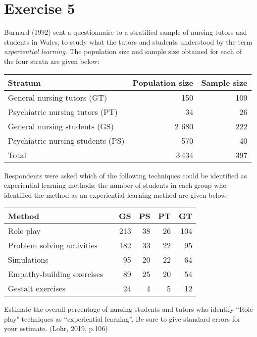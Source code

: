 \documentclass[12pt]{article}
\begin{document}
\section*{Exercise 5}
Burnard (1992) sent a questionnaire to a stratified sample of nursing tutors and students in Wales, to study what the tutors and students understood by the term \emph{experiential learning}. The population size and sample size obtained for each of the four strata are
given below:
\begin{center}
\begin{tabular}{lrr}
Stratum & Population size & Sample size \\
\hline
General nursing tutors (GT) &150 &109\\
Psychiatric nursing tutors (PT)&34 &26\\
General nursing students (GS) &2 680& 222\\
Psychiatric nursing students (PS)&570& 40\\
\hline
Total & 3\,434 &397 \\
\end{tabular}
\end{center}
Respondents were asked which of the following techniques could be identified as experiential learning methods; the number of students in each group who identified
the method as an experiential learning method are given below:
\begin{center}
\begin{tabular}{lrrrrr}
Method & \vline & GS & PS & PT & GT \\
\hline
Role play &\vline & 213 &38& 26 &104\\
Problem solving activities&\vline & 182& 33& 22& 95\\
Simulations &\vline &95 &20 &22 &64\\
Empathy-building exercises &\vline &89 &25& 20& 54\\
Gestalt exercises &\vline &24& 4& 5& 12\\
\end{tabular}
\end{center}
Estimate the overall percentage of nursing students and tutors who identify ``Role play" techniques as “experiential learning”. Be sure to give standard errors for your estimate. \hfill (Lohr, 2019, p.106)
\end{document}
